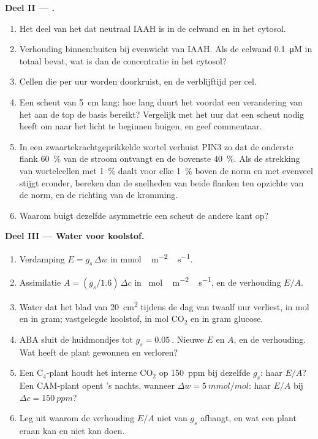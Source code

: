 \begin{problem}
\medskip
\noindent\textbf{Deel II --- .}
\begin{enumerate}[resume]
  \item Het deel van het  dat neutraal IAAH is in de celwand en
        in het cytosol.
  \item Verhouding binnen:buiten bij evenwicht van IAAH. Als de celwand
        \qty{0.1}{\micro M}  in totaal bevat, wat is dan de
        concentratie in het cytosol?
  \item Cellen die per uur worden doorkruist, en de verblijftijd per cel.
  \item Een scheut van \qty{5}{cm} lang: hoe lang duurt het voordat een
        verandering van het  aan de top de basis bereikt?
        Vergelijk met het uur dat een scheut nodig heeft om naar het
        licht te beginnen buigen, en geef commentaar.
  \item In een zwaartekrachtgeprikkelde wortel verhuist PIN3 zo dat de
        onderste flank \qty{60}{\%} van de stroom ontvangt en de
        bovenste \qty{40}{\%}. Als de strekking van wortelcellen met
        \qty{1}{\%} daalt voor elke \qty{1}{\%}  boven de norm en
        met evenveel stijgt eronder, bereken dan de snelheden van beide
        flanken ten opzichte van de norm, en de richting van de
        kromming.
  \item Waarom buigt dezelfde asymmetrie een scheut de andere kant op?
\end{enumerate}

\medskip
\noindent\textbf{Deel III --- Water voor koolstof.}
\begin{enumerate}[resume]
  \item Verdamping $E = g_{s}\,\Delta w$ in \unit{mmol\,m^{-2}\,s^{-1}}.
  \item Assimilatie $A = (g_{s}/1.6)\,\Delta c$ in \unit{\micro
        mol\,m^{-2}\,s^{-1}}, en de verhouding $E/A$.
  \item Water dat het blad van \qty{20}{cm^2} tijdens de dag van twaalf
        uur verliest, in mol en in gram; vastgelegde koolstof, in mol
        CO$_{2}$ en in gram glucose.
  \item ABA sluit de huidmondjes tot $g_{s} = \qty{0.05}{}$. Nieuwe $E$
        en $A$, en de verhouding. Wat heeft de plant gewonnen en verloren?
  \item Een C$_{4}$-plant houdt het interne CO$_{2}$ op \qty{150}{ppm}
        bij dezelfde $g_{s}$: haar $E/A$? Een CAM-plant opent 's nachts,
        wanneer $\Delta w = \qty{5}{mmol/mol}$: haar $E/A$ bij $\Delta c =
        \qty{150}{ppm}$?
  \item Leg uit waarom de verhouding $E/A$ niet van $g_{s}$ afhangt, en
        wat een plant eraan kan en niet kan doen.
\end{enumerate}


\end{problem}
